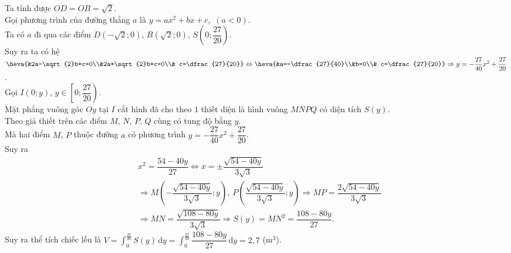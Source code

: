 \begin{bt}
{\begin{center}
		\end{center}
		Ta tính được  $OD=OB=\sqrt{2}$.\\
		Gọi phương trình của đường  thẳng $a$ là $y=ax^2+bx+c$,\ $(a<0)$.\\
		Ta có $a$  đi qua các điểm $D\left(-\sqrt{2};0\right)$, $B\left(\sqrt{2};0\right)$, $S\left(0;\dfrac{27}{20}\right)$.\\
		Suy ra ta  có hệ $\heva{&2a-\sqrt{2}b+c=0\\&2a+\sqrt{2}b+c=0\\& c=\dfrac{27}{20}} \Leftrightarrow\heva{&a=-\dfrac{27}{40}\\&b=0\\& c=\dfrac{27}{20}} \Rightarrow y=-\dfrac{27}{40}x^2+\dfrac{27}{20}$.\\
		Gọi $I(0;y)$, $y\in\left[0;\dfrac{27}{20}\right)$.\\ 
		 Mặt phẳng vuông góc $Oy$ tại $I$ cắt hình đã cho theo $1$ thiết diện là hình vuông $MNPQ$ có diện tích $S(y)$.\\
		 Theo giả thiết trên các điểm $M$, $N$, $P$, $Q$ cùng có tung độ bằng $y$.\\
		Mà  hai điểm $M$, $P$ thuộc đường $a$ có phương trình $y=-\dfrac{27}{40}x^2+\dfrac{27}{20}$.\\
		Suy  ra
		$$\begin{aligned}&x^2=\dfrac{54-40y}{27} \Leftrightarrow x=\pm \dfrac{\sqrt{54-40y}}{3\sqrt{3}}\\
		&\Rightarrow M\left(-\dfrac{\sqrt{54-40y}}{3\sqrt{3}};y\right),\  P\left(\dfrac{\sqrt{54-40y}}{3\sqrt{3}};y\right)\Rightarrow MP=\dfrac{2\sqrt{54-40y}}{3\sqrt{3}}\\&\Rightarrow MN=\dfrac{\sqrt{108-80y}}{3\sqrt{3}} \Rightarrow S(y)=MN^2=\dfrac{108-80y}{27}.
	\end{aligned}$$
	Suy ra thể tích chiếc lều là $V=\displaystyle\int_0^{\tfrac{27}{20}}S(y) \mathrm{\,d}y=\displaystyle\int_0^{\tfrac{27}{20}}\dfrac{108-80y}{27}\mathrm{\,d}y=2{,}7$  (m$^3$).
 }
\end{bt}

